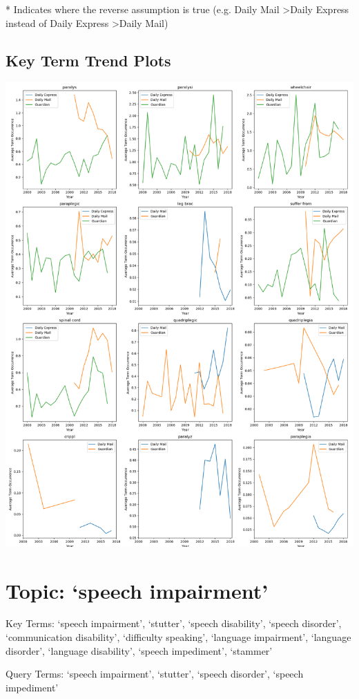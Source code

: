\documentclass{report}
\begin{document}
\noindent ** Indicates where the reverse assumption is true (e.g. Daily Mail \textgreater\space Daily Express instead of Daily Express \textgreater\space Daily Mail)

\subsection{Key Term Trend Plots}
\includegraphics[width=\textwidth]{raw/paralysis-terms.png}

\newpage
\section{Topic: `speech impairment'}
Key Terms: `speech impairment', `stutter', `speech disability', `speech disorder', `communication disability', `difficulty speaking', `language impairment', `language disorder', `language disability', `speech impediment', `stammer'

\noindent Query Terms: `speech impairment', `stutter', `speech disorder', `speech impediment'
\end{document}

